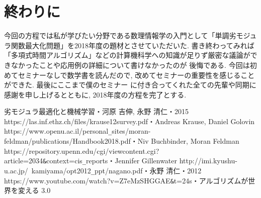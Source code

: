 \documentclass[11pt, a4paper, dvipdfmx]{jsarticle}
\theoremstyle{definition}
\begin{document}
\section{終わりに}
今回の方程では私が学びたい分野である数理情報学の入門として「単調劣モジュラ関数最大化問題」を2018年度の題材とさせていただいた. 
書き終わってみれば「多項式時間アルゴリズム」などの計算機科学への知識が足りず厳密な議論ができなかったことや応用例の詳細について書けなかったのが
後悔である. 今回は初めてセミナーなしで数学書を読んだので, 改めてセミナーの重要性を感じることができた. 最後にここまで僕のセミナー
に付き合ってくれた全ての先輩や同期に感謝を申し上げるとともに, 2018年度の方程を完了とする.






\begin{thebibliography}{10}
     劣モジュラ最適化と機械学習・河原 吉伸,  永野 清仁・2015
     https://las.inf.ethz.ch/files/krause12survey.pdf・Andreas Krause, Daniel Golovin
     https://www.openu.ac.il/personal\verb|_|sites/moran-feldman/publications/Handbook2018.pdf・Niv Buchbinder, Moran Feldman
     https://repository.upenn.edu/cgi/viewcontent.cgi?article=2034\verb|&|context=cis\verb|_|reports・Jennifer Gillenwater
     http://imi.kyushu-u.ac.jp/~kamiyama/opt2012\verb|_|ppt/nagano.pdf・永野 清仁・2012
     https://www.youtube.com/watch?v=Z7eMzSHGGAE\verb|&|t=24s・アルゴリズムが世界を変える 3.0
  \end{thebibliography}
\end{document}
